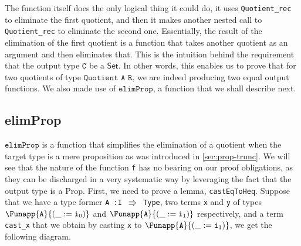 \documentclass[12pt,twoside,maitrise]{dms}
\theoremstyle{definition}
\numberwithin{equation}{section}
\numberwithin{table}{chapter}
\numberwithin{figure}{chapter}
\newcommand\kw[1] {\textsf{#1}}
\newcommand\id[1] {\texttt{#1}}
\newcommand\fn[1] {\texttt{#1}}
\begin{document}
The function itself does the only logical thing it could do, it uses
\id{Quotient\_rec} to eliminate the first quotient, and then it makes another
nested call to \id{Quotient\_rec} to eliminate the second one. Essentially, the
result of the elimination of the first quotient is a function that takes another
quotient as an argument and then eliminates that. This is the intuition behind
the requirement that the output type $\id{C}$ be a $\kw{Set}$. In other words,
this enables us to prove that for two quotients of type $\id{Quotient A R}$, we
are indeed producing two equal output functions. We also made use of
$\id{elimProp}$, a function that we shall describe next.

\subsection*{elimProp}
$\id{elimProp}$ is a function that simplifies the elimination of a quotient when
the target type is a mere proposition as was introduced in
\autoref{sec:prop-trunc}. We will see that the nature of the function \id{f} has
no bearing on our proof obligations, as they can be discharged in a very
systematic way by leveraging the fact that the output type is a \kw{Prop}.
First, we need to prove a lemma, \id{castEqToHeq}. Suppose that we have a type
former \fn{A :\@ I $\Rrightarrow$ Type}, two terms \id{x} and \id{y} of
types $\Funapp{\id{A}}{(\earg{\_}{\ileft})}$ and
$\Funapp{\id{A}}{(\earg{\_}{\iright})}$ respectively, and a term \id{cast\_x}
that we obtain by casting \id{x} to $\Funapp{\id{A}}{(\earg{\_}{\iright})}$, we
get the following diagram.
\end{document}

